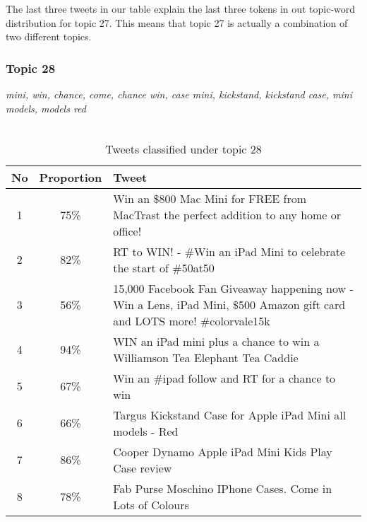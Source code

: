 The last three tweets in our table explain the last three tokens in out topic-word distribution for
topic 27. This means that topic 27 is actually a combination of two different topics.



\subsubsection{Topic 28}
\label{sec:topic_28}
\textit{mini, win, chance, come, chance win, case mini, kickstand, kickstand case, mini models,
models red}\\\\

\begin{table}[H]
  \begin{tabular}{c c p{13cm}} \toprule
    No & Proportion & Tweet \\ \midrule
    1  & 75\%       & Win an \$800 Mac Mini for FREE from MacTrast the perfect addition to any home or office! \\ \midrule
    2  & 82\%       & RT to WIN! - \#Win an iPad Mini to celebrate the start of \#50at50 \\ \midrule
    3  & 56\%       & 15,000 Facebook Fan Giveaway happening now - Win a Lens, iPad Mini, \$500 Amazon gift card and LOTS more! \#colorvale15k \\ \midrule
    4  & 94\%       & WIN an iPad mini plus a chance to win a Williamson Tea Elephant Tea Caddie \\ \midrule
    5  & 67\%       & Win an \#ipad follow and RT for a chance to win \\ \midrule
    6  & 66\%       & Targus Kickstand Case for Apple iPad Mini all models - Red \\ \midrule
    7  & 86\%       & Cooper Dynamo Apple iPad Mini Kids Play Case review \\ \midrule
    8  & 78\%       & Fab Purse Moschino IPhone Cases. Come in Lots of Colours \\ \bottomrule
  \end{tabular}
  \caption{Tweets classified under topic 28}
  \label{tab:tweets_under_28}
\end{table}

